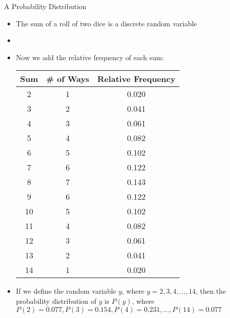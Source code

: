 \documentclass[xcolor=dvipsnames]{beamer}
\begin{document}
\begin{frame}{A Probability Distribution}
	\begin{itemize}
		\item The sum of a roll of two dice is a discrete random variable 
		\item[]
		\item Now we add the relative frequency of each sum: \pause
		{ \tiny
			\begin{center}
				\begin{tabular}{|c|c|c|} \hline
					\textbf{Sum} & \textbf{\# of Ways} & Relative Frequency  \\ \hline \hline
					2 &    1 & 0.020 \\ \hline
					3  &   2 & 0.041\\ \hline
					4  &   3 &  0.061\\ \hline
					5  &   4 &   0.082\\ \hline
					6  &   5 & 0.102\\ \hline
					7  &   6 & 0.122\\ \hline
					8  &   7 & 0.143\\ \hline
					9  &   6 & 0.122\\ \hline
					10  &   5 & 0.102\\ \hline
					11  &   4 & 0.082\\ \hline
					12  &   3 & 0.061\\ \hline
					13  &   2 & 0.041\\ \hline
					14  &   1 &  0.020\\ \hline
				\end{tabular}
		\end{center}} \pause
	\item If we define the random variable $y$, where $y = 2, 3, 4, \hdots, 14$, then the probability distribution of $y$ is $P(y)$, where $P(2) = 0.077, P(3) = 0.154, P(4) = 0.231, \hdots, P(14) = 0.077$ 
	\end{itemize}
\end{frame}
\end{document}

